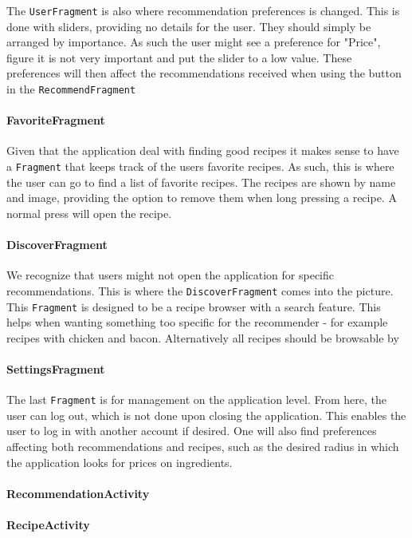 The \texttt{UserFragment} is also where recommendation preferences is changed. This is done with sliders, providing no details for the user. They should simply be arranged by importance. As such the user might see a preference for "Price", figure it is not very important and put the slider to a low value. These preferences will then affect the recommendations received when using the button in the \texttt{RecommendFragment}

\paragraph{FavoriteFragment}
Given that the application deal with finding good recipes it makes sense to have a \texttt{Fragment} that keeps track of the users favorite recipes. As such, this is where the user can go to find a list of favorite recipes. The recipes are shown by name and image, providing the option to remove them when long pressing a recipe. A normal press will open the recipe.

\paragraph{DiscoverFragment}
We recognize that users might not open the application for specific recommendations. This is where the \texttt{DiscoverFragment} comes into the picture. This \texttt{Fragment} is designed to be a recipe browser with a search feature. This helps when wanting something too specific for the recommender - for example recipes with chicken and bacon. Alternatively all recipes should be browsable by 

\paragraph{SettingsFragment}
The last \texttt{Fragment} is for management on the application level. From here, the user can log out, which is not done upon closing the application. This enables the user to log in with another account if desired. One will also find preferences affecting both recommendations and recipes, such as the desired radius in which the application looks for prices on ingredients.

\paragraph{RecommendationActivity}

\paragraph{RecipeActivity}